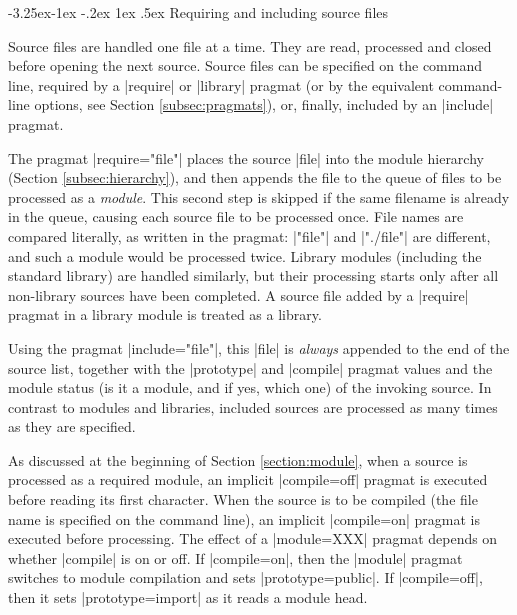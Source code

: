 \documentclass[titlepage]{article}
\makeatletter
\renewcommand\subsection{%
\@startsection{subsection}{2}{\z@}%
   {-3.25ex\@plus -1ex \@minus -.2ex}%
   {1ex \@plus .5ex}%
   {\normalfont\normalsize\bfseries}}
\makeatother
\begin{document}

\subsection{Requiring and including source files}

Source files are handled one file at a time. They are read, processed and closed
before opening the next source. Source files can be specified on the command
line, required by a \pp|require| or \pp|library| pragmat (or by the
equivalent command-line options, see Section \ref{subsec:pragmats}), or,
finally, included by an \pp|include| pragmat.

The pragmat \pp|require="file"| places the source \pp|file| into the module
hierarchy (Section \ref{subsec:hierarchy}), and then appends the file to the
queue of files to be processed as a \emph{module}. This second step is skipped
if the same filename is already in the queue, causing each source file to be
processed once. File names are compared literally, as written in the
pragmat: \pp|"file"| and \pp|"./file"| are different, and such a module
would be processed twice. Library modules (including the standard library)
are handled similarly, but their processing starts only after all non-library sources
have been completed. A source file added by a \pp|require| pragmat in a
library module is treated as a library.

Using the pragmat \pp|include="file"|, this \pp|file| is \emph{always}
appended to the end of the source list, together with the \pp|prototype| and
\pp|compile| pragmat values and the module status (is it a module, and if
yes, which one) of the invoking source. In contrast to modules and
libraries, included sources are processed as many times as they are
specified.

As discussed at the beginning of Section \ref{section:module}, when a source
is processed as a required module, an implicit \pp|compile=off| pragmat is
executed before reading its first character. When the source is to be
compiled (the file name is specified on the command line), an implicit
\pp|compile=on| pragmat is executed before processing. The effect of a
\pp|module=XXX| pragmat depends on whether \pp|compile| is on or off. If
\pp|compile=on|, then the \pp|module| pragmat switches to module compilation
and sets \pp|prototype=public|. If \pp|compile=off|, then it 
sets \pp|prototype=import| as it reads a module head.

\end{document}
